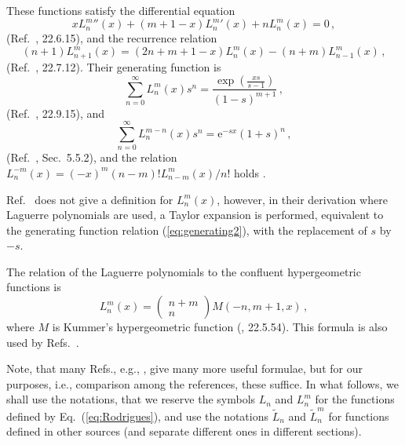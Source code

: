 \documentclass[a4paper,12pt,final]{article}
\def\e{\mathrm{e}}
\begin{document}
These functions satisfy the differential equation
\begin{equation}\label{eq:ODE}
 x {L_n^m}''(x) + (m+1-x){L_n^m}'(x) +n L_n^m(x) =0\,,
\end{equation}
(Ref.\ \cite{AbrSteg}, 22.6.15), and the recurrence relation
\begin{equation}\label{eq:recursion}
 (n+1)L_{n+1}^m(x) = (2n+m+1 - x) L_n^m(x) -(n+m)L_{n-1}^m(x)\,,
\end{equation}
(Ref.\ \cite{AbrSteg}, 22.7.12). Their generating function is
\begin{equation}\label{eq:generating}
 \sum_{n=0}^\infty L_n^m(x) s^n = \frac{\exp\left(\frac{xs}{s-1}\right)}{(1-s)^{m+1}}\,,
\end{equation}
(Ref.\ \cite{AbrSteg}, 22.9.15), and
\begin{equation}
 \label{eq:generating2}
 \sum_{n=0}^\infty L_n^{m-n}(x)s^n = \e^{-sx}(1+s)^n\,,
\end{equation}
(Ref.\ \cite{MO}, Sec.\ 5.5.2), and the relation $L_n^{-m}(x) = (-x)^m (n-m)! L_{n-m}^m(x)/n!$ holds \cite{MO}.

Ref.\ \cite{PZ} does not give a definition for $L_n^m(x)$, however, in their derivation where Laguerre polynomials are used, a Taylor expansion is performed, equivalent to the generating function relation (\ref{eq:generating2}), with the replacement of $s$ by $-s$.


The relation of the Laguerre polynomials to the confluent hypergeometric functions is
\begin{equation}
 \label{eq:hyp}
 L_n^m(x) = \begin{pmatrix} n+m \\ n \end{pmatrix} M(-n,m+1,x)\,,
\end{equation}
where $M$ is Kummer's hypergeometric function (\cite{AbrSteg}, 22.5.54). This formula is also used by Refs.\ \cite{Flugge, Mahan}.

Note, that many Refs., e.g., \cite{AbrSteg, NIST, RG, AWH}, give many more useful formulae, but for our purposes, i.e., comparison among the references, these suffice.
In what follows, we shall use the notations, that we reserve the symbols $L_n$ and $L_n^m$ for the functions defined by Eq.\ (\ref{eq:Rodrigues}), and use the notations ${\tilde L}_n$ and ${\tilde L}_n^m$ for functions defined in other sources (and separate different ones in different sections).
\end{document}
